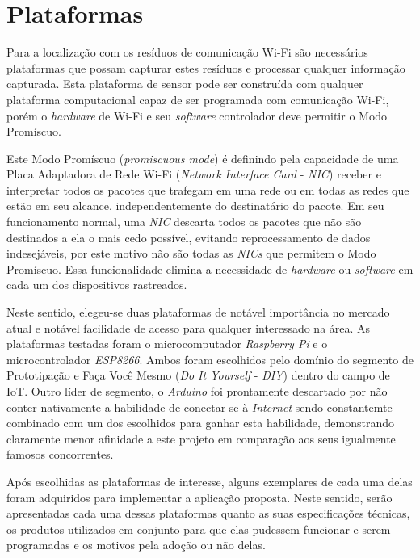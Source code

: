 \chapter{Plataformas}
\label{chap:Plataformas}

Para a localização com os resíduos de comunicação Wi-Fi são necessários
plataformas que possam capturar estes resíduos e processar qualquer informação
capturada. Esta plataforma de sensor pode ser construída com
qualquer plataforma computacional capaz de ser programada com comunicação
Wi-Fi, porém o \emph{hardware} de Wi-Fi e seu \emph{software}
controlador deve permitir o Modo Promíscuo.

Este Modo Promíscuo (\emph{promiscuous mode}) é definindo pela capacidade de uma
Placa Adaptadora de Rede Wi-Fi (\emph{Network Interface Card} -
\emph{NIC}) receber e interpretar todos os pacotes que trafegam em uma rede ou
em todas as redes que estão em seu alcance, independentemente do destinatário do
pacote. Em seu funcionamento normal, uma \emph{NIC} descarta todos os pacotes que
não são destinados a ela o mais cedo possível, evitando reprocessamento de
dados indesejáveis, por este motivo não são todas as \emph{NICs} que permitem o
Modo Promíscuo. Essa funcionalidade elimina a necessidade de \emph{hardware} ou
\emph{software} em cada um dos dispositivos rastreados.

Neste sentido, elegeu-se duas plataformas de notável importância no mercado atual
e notável facilidade de acesso para qualquer interessado na área. As plataformas
testadas foram o microcomputador \emph{Raspberry Pi} e o microcontrolador
\emph{ESP8266}. Ambos  foram escolhidos pelo domínio do segmento de Prototipação
e Faça Você Mesmo  (\emph{Do It Yourself} - \emph{DIY}) dentro do campo de IoT.
Outro líder de segmento, o \emph{Arduino}  foi prontamente descartado por não
conter nativamente a habilidade de conectar-se à \emph{Internet} sendo
constantemte combinado com um dos escolhidos para ganhar esta habilidade,
demonstrando claramente menor afinidade a este projeto em comparação aos seus
igualmente famosos concorrentes.

Após escolhidas as plataformas de interesse, alguns exemplares de cada uma delas
foram adquiridos para implementar a aplicação proposta. Neste sentido, serão
apresentadas cada uma dessas plataformas quanto as suas especificações técnicas,
os produtos utilizados em conjunto para que elas pudessem funcionar e serem
programadas e os motivos pela adoção ou não delas.
